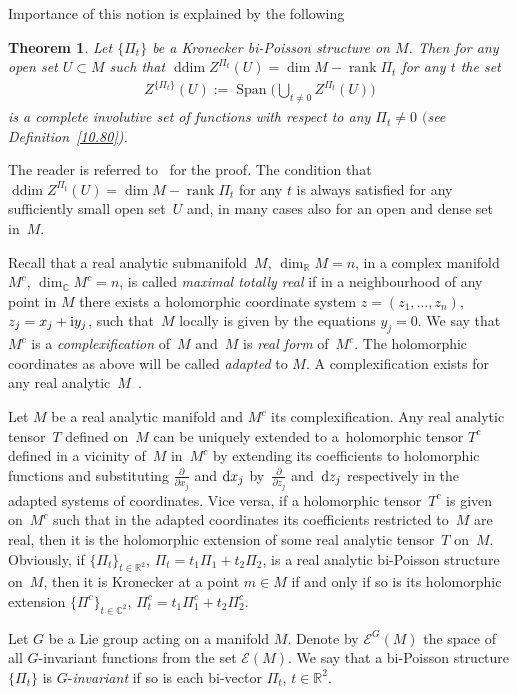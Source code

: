 \documentclass[10pt,a4paper]{amsart}
\numberwithin{equation}{section}
\newtheorem{Theorem}{Theorem}[section]
\begin{document}
Importance of this notion is explained by the following

\begin{Theorem}\label{prop}Let $\{\Pi_t\}$ be a Kronecker bi-Poisson structure on $M$. Then for any open set $U \subset M$ such that $\operatorname{ddim} Z^{\Pi_t}(U)=\dim M-\operatorname{rank} \Pi_t$ for any $t$ the set
\begin{gather*}
Z^{\{\Pi_t\}}(U):=\operatorname{Span}\bigg(\bigcup_{t\not=0}Z^{\Pi_t}(U)\bigg)
\end{gather*}
is a complete involutive set of functions with respect to any $\Pi_t\not =0$ $($see Definition~{\rm \ref{10.80})}.
\end{Theorem}
The reader is referred to~\cite{bols'} for the proof. The condition that $\operatorname{ddim} Z^{\Pi_t}(U)=\dim M-\operatorname{rank} \Pi_t$ for any $t$ is always satisfied for any sufficiently small open set~$U$ and, in many cases also for an open and dense set in~$M$.

\begin{Remark}\label{rem}Recall that a real analytic submanifold~$M$, $\dim_\mathbb{R} M=n$, in a complex manifold~${M}^c$, $\dim_\mathbb{C}{M}^c=n$, is called \emph{maximal totally real} if in a neighbourhood of any point in $M$ there exists a holomorphic coordinate system $z=(z_1,\dots,z_n)$, $z_j=x_j+{\rm i}y_j$, such that~$M$ locally is given by the equations $y_j=0$. We say that ${M}^c$ is a \emph{complexification} of~$M$ and~$M$ is \emph{real form} of~${M}^c$. The holomorphic coordinates as above will be called \emph{adapted} to $M$. A complexification exists for any real analytic~$M$~\cite{bw}.

Let $M$ be a real analytic manifold and ${M}^c$ its complexification. Any real analytic tensor~$T$ defined on~$M$ can be uniquely extended to a~holomorphic tensor ${T}^c$ defined in a vicinity of~$M$ in~${M}^c$ by extending its coefficients to holomorphic functions and substituting $\frac{\partial }{\partial x_j}$ and ${\rm d}x_j$ by~$\frac{\partial }{\partial z_j}$ and~${\rm d}z_j$ respectively in the adapted systems of coordinates. Vice versa, if a holomorphic tensor~${T}^c$ is given on~${M}^c$ such that in the adapted coordinates its coefficients restricted to~$M$ are real, then it is the holomorphic extension of some real analytic tensor~$T$ on~$M$. Obviously, if $\{\Pi_t\}_{t\in\mathbb{R}^2}$, $\Pi_t=t_1\Pi_1+t_2\Pi_2$, is a real analytic bi-Poisson structure on~$M$, then it is Kronecker at a point $m\in M$ if and only if so is its holomorphic extension $\{{\Pi}^c\}_{t\in\mathbb{C}^2}$, ${\Pi}^c_t=t_1{\Pi}^c_1+t_2 {\Pi}^c_2$.

\end{Remark}Let $G$ be a Lie group acting on a manifold $M$. Denote by $\mathcal{E}^G(M)$ the space of all $G$-invariant functions from the set ${\mathcal E}(M)$. We say that a bi-Poisson structure $\{\Pi_t\}$ is $G$-\emph{invariant} if so is each bi-vector $\Pi_t$, $t\in\mathbb{R}^2$.
\end{document}
